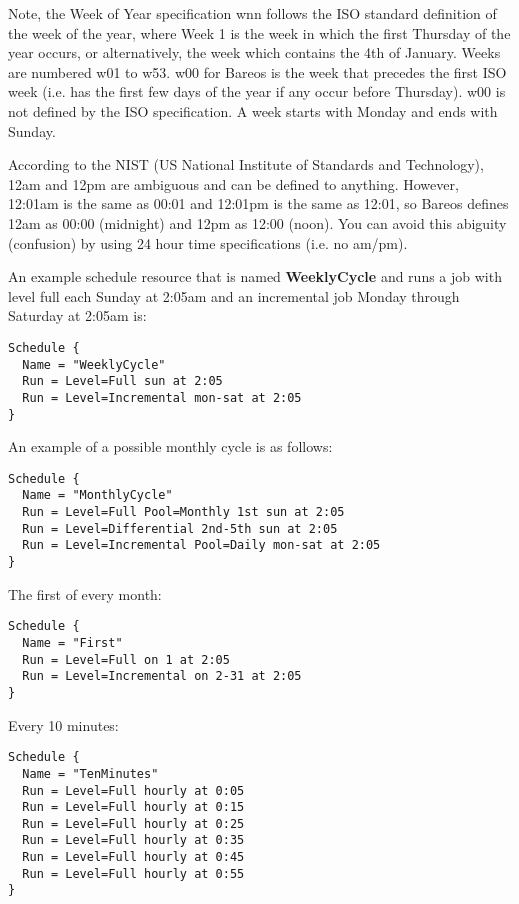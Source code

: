Note, the Week of Year specification wnn follows the ISO standard definition
of the week of the year, where Week 1 is the week in which the first Thursday
of the year occurs, or alternatively, the week which contains the 4th of
January. Weeks are numbered w01 to w53. w00 for Bareos is the week that
precedes the first ISO week (i.e. has the first few days of the year if any
occur before Thursday). w00 is not defined by the ISO specification. A week
starts with Monday and ends with Sunday.

According to the NIST (US National Institute of Standards and Technology),
12am and 12pm are ambiguous and can be defined to anything.  However,
12:01am is the same as 00:01 and 12:01pm is the same as 12:01, so Bareos
defines 12am as 00:00 (midnight) and 12pm as 12:00 (noon).  You can avoid
this abiguity (confusion) by using 24 hour time specifications (i.e.  no
am/pm).

An example schedule resource that is named {\bf WeeklyCycle} and runs a job
with level full each Sunday at 2:05am and an incremental job Monday through
Saturday at 2:05am is:

\footnotesize
\begin{verbatim}
Schedule {
  Name = "WeeklyCycle"
  Run = Level=Full sun at 2:05
  Run = Level=Incremental mon-sat at 2:05
}
\end{verbatim}
\normalsize

An example of a possible monthly cycle is as follows:

\footnotesize
\begin{verbatim}
Schedule {
  Name = "MonthlyCycle"
  Run = Level=Full Pool=Monthly 1st sun at 2:05
  Run = Level=Differential 2nd-5th sun at 2:05
  Run = Level=Incremental Pool=Daily mon-sat at 2:05
}
\end{verbatim}
\normalsize

The first of every month:

\footnotesize
\begin{verbatim}
Schedule {
  Name = "First"
  Run = Level=Full on 1 at 2:05
  Run = Level=Incremental on 2-31 at 2:05
}
\end{verbatim}
\normalsize

Every 10 minutes:

\footnotesize
\begin{verbatim}
Schedule {
  Name = "TenMinutes"
  Run = Level=Full hourly at 0:05
  Run = Level=Full hourly at 0:15
  Run = Level=Full hourly at 0:25
  Run = Level=Full hourly at 0:35
  Run = Level=Full hourly at 0:45
  Run = Level=Full hourly at 0:55
}
\end{verbatim}
\normalsize

